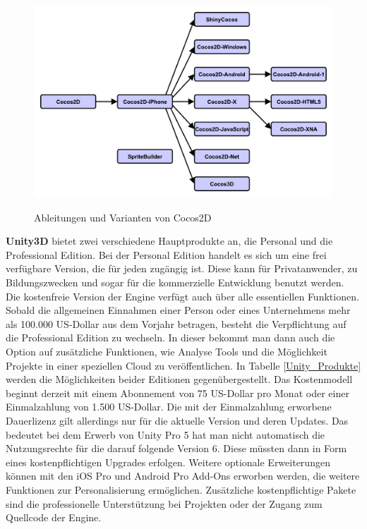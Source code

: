 \begin{figure}[htbp]
	\centering
	\includegraphics[width=1\textwidth]{Bilder/Cocos2d_Relationships}
	\caption{Ableitungen und Varianten von Cocos2D}\label{graph_Cocos2d_Relationships}\citep{cocos2d_relationships}
\end{figure}

\bigskip
\textbf{Unity3D} bietet zwei verschiedene Hauptprodukte an, die Personal und die Professional Edition. Bei der Personal Edition handelt es sich um eine frei verfügbare Version, die für jeden zugängig ist. Diese kann für Privatanwender, zu Bildungszwecken und sogar für die kommerzielle Entwicklung benutzt werden. Die kostenfreie Version der Engine verfügt auch über alle essentiellen Funktionen. Sobald die allgemeinen Einnahmen einer Person oder eines Unternehmens mehr als 100.000 US-Dollar aus dem Vorjahr betragen, besteht die Verpflichtung auf die Professional Edition zu wechseln. In dieser bekommt man dann auch die Option auf zusätzliche Funktionen, wie Analyse Tools und die Möglichkeit Projekte in einer speziellen Cloud zu veröffentlichen. In Tabelle \ref{Unity_Produkte} werden die Möglichkeiten beider Editionen gegenübergestellt. Das Kostenmodell beginnt derzeit mit einem Abonnement von 75 US-Dollar pro Monat oder einer Einmalzahlung von 1.500 US-Dollar. Die mit der Einmalzahlung erworbene Dauerlizenz gilt allerdings nur für die aktuelle Version und deren Updates. Das bedeutet bei dem Erwerb von Unity Pro 5 hat man nicht automatisch die Nutzungsrechte für die darauf folgende Version 6. Diese müssten dann in Form eines kostenpflichtigen Upgrades erfolgen. Weitere optionale Erweiterungen können mit den iOS Pro und Android Pro Add-Ons erworben werden, die weitere Funktionen zur Personalisierung ermöglichen. Zusätzliche kostenpflichtige Pakete sind die professionelle Unterstützung bei Projekten oder der Zugang zum Quellcode der Engine. \citep{unity_products}

